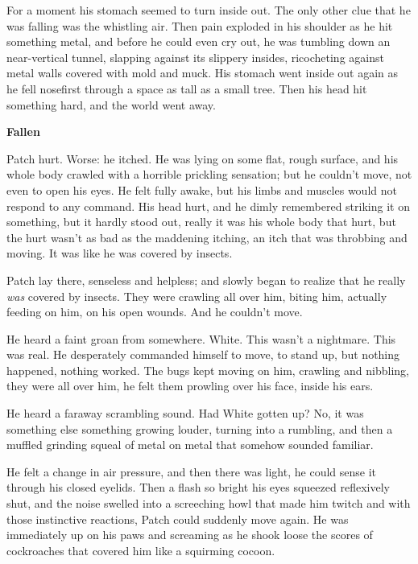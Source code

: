 \documentclass[11pt]{article}
\begin{document}
 For a moment his stomach seemed to turn inside out. The only other clue that he was falling was the whistling air. Then pain exploded in his shoulder as he hit something metal, and before he could even cry out, he was tumbling down an near-vertical tunnel, slapping against its slippery insides, ricocheting against metal walls covered with mold and muck. His stomach went inside out again as he fell nosefirst through a space as tall as a small tree. Then his head hit something hard, and the world went away.\par
\par
{\bf Fallen\par
}\par
 Patch hurt. Worse: he itched. He was lying on some flat, rough surface, and his whole body crawled with a horrible prickling sensation; but he couldn't move, not even to open his eyes. He felt fully awake, but his limbs and muscles would not respond to any command. His head hurt, and he dimly remembered striking it on something, but it hardly stood out, really it was his whole body that hurt, but the hurt wasn't as bad as the maddening itching, an itch that was throbbing and moving. It was like he was covered by insects.\par
 Patch lay there, senseless and helpless; and slowly began to realize that he really {\it was} covered by insects. They were crawling all over him, biting him, actually feeding on him, on his open wounds. And he couldn't move.\par
 He heard a faint groan from somewhere. White. This wasn't a nightmare. This was real. He desperately commanded himself to move, to stand up, but nothing happened, nothing worked. The bugs kept moving on him, crawling and nibbling, they were all over him, he felt them prowling over his face, inside his ears.\par
 He heard a faraway scrambling sound. Had White gotten up? No, it was something else %
 something growing louder, turning into a rumbling, and then a muffled grinding squeal of metal on metal that somehow sounded familiar.\par
 He felt a change in air pressure, and then there was light, he could sense it through his closed eyelids. Then a flash so bright his eyes squeezed reflexively shut, and the noise swelled into a screeching howl that made him twitch %
 and with those instinctive reactions, Patch could suddenly move again. He was immediately up on his paws and screaming as he shook loose the scores of cockroaches that covered him like a squirming cocoon.\par
\end{document}
